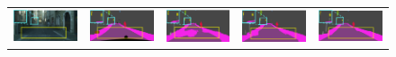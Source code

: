 \documentclass[letterpaper]{article} %
\begin{document}
\begin{figure}[!t]
  \centering
  \setlength{\fboxsep}{0pt}
  \begin{tabular}{ccccc}
  \includegraphics[width=0.19\linewidth]{image/figure6/1a.png}\label{1a} &
  \hspace{-12pt}
  \includegraphics[width=0.19\linewidth]{image/figure6/1b.png}\label{1b} &
  \hspace{-12pt}
  \includegraphics[width=0.19\linewidth]{image/figure6/1c.png}\label{1c} &
  \hspace{-12pt}
  \includegraphics[width=0.19\linewidth]{image/figure6/1d.png}\label{1d} &
  \hspace{-12pt}
  \includegraphics[width=0.19\linewidth]{image/figure6/1e.png}\label{1e} \\


\end{tabular}
\end{figure}
\end{document}
